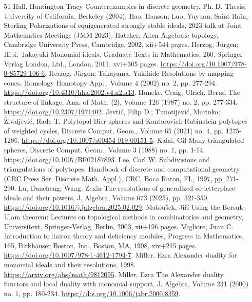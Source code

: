 \begin{thebibliography}{51}
 Hall, Huntington Tracy Counterexamples in discrete geometry, Ph. D. Thesis, University of California, Berkeley (2004).
 Hao, Hanson; Luo, Yuyuan; Saint Rain, Sterling Polarizations of equigenerated strongly stable ideals, 2023 talk at Joint Mathematics Meetings (JMM 2023).
 Hatcher, Allen Algebraic topology, Cambridge University Press, Cambridge, 2002, xii+544 pages.
 Herzog, Jürgen; Hibi, Takayuki Monomial ideals, Graduate Texts in Mathematics, 260, Springer-Verlag London, Ltd., London, 2011, xvi+305 pages. \url{https://doi.org/10.1007/978-0-85729-106-6}.
 Herzog, Jürgen; Takayama, Yukihide Resolutions by mapping cones, Homology Homotopy Appl., Volume 4 (2002) no. 2, pp. 277-294. \url{https://doi.org/10.4310/hha.2002.v4.n2.a13}.
 Huneke, Craig; Ulrich, Bernd The structure of linkage, Ann. of Math. (2), Volume 126 (1987) no. 2, pp. 277-334. \url{https://doi.org/10.2307/1971402}.
 Jevtić, Filip D.; Timotijević, Marinko; Živaljević, Rade T. Polytopal Bier spheres and Kantorovich-Rubinstein polytopes of weighted cycles, Discrete Comput. Geom., Volume 65 (2021) no. 4, pp. 1275-1286. \url{https://doi.org/10.1007/s00454-019-00151-5}.
 Kalai, Gil Many triangulated spheres, Discrete Comput. Geom., Volume 3 (1988) no. 1, pp. 1-14. \url{https://doi.org/10.1007/BF02187893}.
 Lee, Carl W. Subdivisions and triangulations of polytopes, Handbook of discrete and computational geometry (CRC Press Ser. Discrete Math. Appl.), CRC, Boca Raton, FL, 1997, pp. 271-290.
 Lu, Dancheng; Wang, Zexin The resolutions of generalized co-letterplace ideals and their powers, J. Algebra, Volume 673 (2025), pp. 321-350. \url{https://doi.org/10.1016/j.jalgebra.2025.02.029}.
 Matoušek, Jiří Using the Borsuk-Ulam theorem: Lectures on topological methods in combinatorics and geometry, Universitext, Springer-Verlag, Berlin, 2003, xii+196 pages.
 Migliore, Juan C. Introduction to liaison theory and deficiency modules, Progress in Mathematics, 165, Birkhäuser Boston, Inc., Boston, MA, 1998, xiv+215 pages. \url{https://doi.org/10.1007/978-1-4612-1794-7}.
 Miller, Ezra Alexander duality for monomial ideals and their resolutions, 1998. \url{https://arxiv.org/abs/math/9812095}.
 Miller, Ezra The Alexander duality functors and local duality with monomial support, J. Algebra, Volume 231 (2000) no. 1, pp. 180-234. \url{https://doi.org/10.1006/jabr.2000.8359}.

\end{thebibliography}
